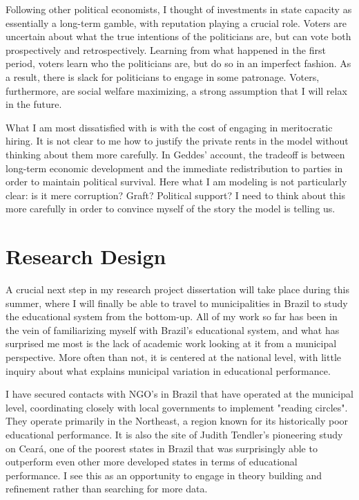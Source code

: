 \documentclass[12pt,a4paper]{article}
\begin{document}
Following other political economists, I thought of investments in state capacity as essentially a long-term gamble, with reputation playing a crucial role. Voters are uncertain about what the true intentions of the politicians are, but can vote both prospectively and retrospectively. Learning from what happened in the first period, voters learn who the politicians are, but do so in an imperfect fashion. As a result, there is slack for politicians to engage in some patronage. Voters, furthermore, are social welfare maximizing, a strong assumption that I will relax in the future.

What I am most dissatisfied with is with the cost of engaging in meritocratic hiring. It is not clear to me how to justify the private rents in the model without thinking about them more carefully. In Geddes' account, the tradeoff is between long-term economic development and the immediate redistribution to parties in order to maintain political survival. Here what I am modeling is not particularly clear: is it mere corruption? Graft? Political support? I need to think about this more carefully in order to convince myself of the story the model is telling us.

\section{Research Design}

A crucial next step in my research project dissertation will take place during this summer, where I will finally be able to travel to municipalities in Brazil to study the educational system from the bottom-up. All of my work so far has been in the vein of familiarizing myself with Brazil's educational system, and what has surprised me most is the lack of academic work looking at it from a municipal perspective. More often than not, it is centered at the national level, with little inquiry about what explains municipal variation in educational performance.

I have secured contacts with NGO's in Brazil that have operated at the municipal level, coordinating closely with local governments to implement "reading circles". They operate primarily in the Northeast, a region known for its historically poor educational performance. It is also the site of Judith Tendler's pioneering study on Ceará, one of the poorest states in Brazil that was surprisingly able to outperform even other more developed states in terms of educational performance. I see this as an opportunity to engage in theory building and refinement rather than searching for more data.
\end{document}
